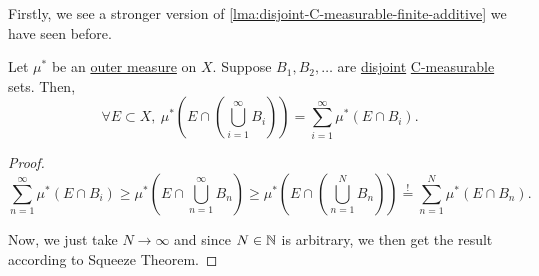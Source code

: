 Firstly, we see a stronger version of \autoref{lma:disjoint-C-measurable-finite-additive} we have seen before.
\begin{lemma}\label{lma:disjoint-C-measurable-infinite-additive}
	Let \(\mu^{\ast} \) be an \hyperref[def:outer-measure]{outer measure} on \(X\). Suppose \(B_1, B_2, \ldots\) are \underline{disjoint} \hyperref[def:C-measurable]{C-measurable} sets.
	Then,
	\[
		\forall E\subset X,\ \mu^{\ast} \left(E\cap \left(\bigcup\limits_{i=1}^{\infty} B_{i}\right)\right) = \sum\limits_{i=1}^{\infty} \mu^{\ast} \left(E\cap B_i\right).
	\]
\end{lemma}
\begin{proof}
	\[
		\sum\limits_{n=1}^{\infty} \mu^{\ast} (E\cap B_{i}) \geq \mu^{\ast} \left(E\cap \bigcup\limits_{n=1}^{\infty} B_{n}\right) \geq\mu^{\ast} \left(E\cap \left(\bigcup\limits_{n=1}^{N} B_{n}\right)\right) \overset{\hyperref[lma:disjoint-C-measurable-finite-additive]{!}}{=} \sum\limits_{n=1}^{N} \mu^{\ast} \left(E\cap B_n\right).
	\]

	Now, we just take \(N\to \infty \) and since \(N\in\mathbb{\MakeUppercase{N}} \) is arbitrary, we then get the result according to Squeeze Theorem.
\end{proof}

